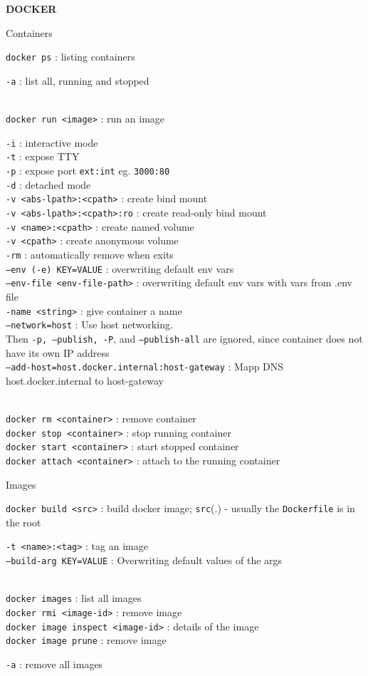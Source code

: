 \documentclass[10pt]{article}
\newcommand{\code}[1]{{\color{teal}\texttt{#1}}}
\newcommand{\cmd}[3][.3]{\code{#2} : #3 \\[#1em]}
\newcommand{\opts}[2][.5]{\hspace*{.5cm}\begin{minipage}{0.9\textwidth}
  #2
  \vspace*{-1em}
\end{minipage}\\[#1em]}
\newcommand{\cluster}[2]{\begin{mybox}{#1}
  #2
  \vspace*{-1.3em}
\end{mybox}}
\newcommand{\mytitle}[1]{
  \begin{center}
    \begin{titlebox}
      {\large \textbf{#1}}
    \end{titlebox}
  \end{center}
  \vspace*{-1.8em}
}
\begin{document}
\pagestyle{fancy}

\mytitle{DOCKER}

\begin{multicols*}{2}

  \cluster{Containers}{
    \cmd{docker ps}{listing containers}
    \opts{
      \code{-a} : list all, running and stopped \\
    }
    \cmd{docker run <image>}{run an image}
    \opts{
      \code{-i} : interactive mode \\
      \code{-t} : expose TTY \\
      \code{-p} : expose port \code{ext:int} eg. \code{3000:80} \\
      \code{-d} : detached mode \\
      \code{-v <abs-lpath>:<cpath>} : create bind mount \\
      \code{-v <abs-lpath>:<cpath>:ro} : create read-only bind mount \\
      \code{-v <name>:<cpath>} : create named volume \\
      \code{-v <cpath>} : create anonymous volume \\
      \code{-rm} : automatically remove when exits \\
      \code{---env (-e) KEY=VALUE} : overwriting default env vars \\
      \cmd{---env-file <env-file-path>}{overwriting default env vars with vars from .env file}
      \code{-name <string>} : give container a name \\
      \cmd{---network=host}{Use host networking. \\ Then \code{-p, --publish, -P}, and \code{--publish-all} are ignored, since container does not have its own IP address}
      \cmd{---add-host=host.docker.internal:host-gateway}{Mapp DNS host.docker.internal to host-gateway}
    }
    \code{docker rm <container>} : remove container \\[.3em]
    \code{docker stop <container>} : stop running container \\[.3em]
    \code{docker start <container>} : start stopped container \\[.3em]
    \code{docker attach <container>} : attach to the running container \\[.3em]
  }

  \cluster{Images}{
    \cmd{docker build <src>}{build docker image; \code{src}(.) - usually the \code{Dockerfile} is in the root}
    \opts{
      \code{-t <name>:<tag>} : tag an image \\
      \cmd{---build-arg KEY=VALUE}{Overwriting default values of the args}
    }
    \code{docker images} : list all images \\[.3em]
    \code{docker rmi <image-id>} : remove image \\[.3em]
    \code{docker image inspect <image-id>} : details of the image\\[.3em]
    \code{docker image prune} : remove image \\[.3em]
    \opts{
      \code{-a} : remove all images \\
    }
  }


\end{multicols*}
\end{document}
